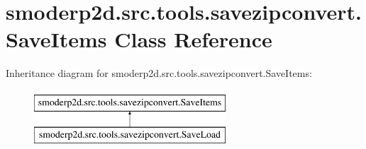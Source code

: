 \hypertarget{classsmoderp2d_1_1src_1_1tools_1_1savezipconvert_1_1SaveItems}{\section{smoderp2d.\-src.\-tools.\-savezipconvert.\-Save\-Items Class Reference}
\label{classsmoderp2d_1_1src_1_1tools_1_1savezipconvert_1_1SaveItems}
}
Inheritance diagram for smoderp2d.\-src.\-tools.\-savezipconvert.\-Save\-Items\-:\begin{figure}[H]
\begin{center}
\leavevmode
\includegraphics[height=2.000000cm]{classsmoderp2d_1_1src_1_1tools_1_1savezipconvert_1_1SaveItems}
\end{center}
\end{figure}
